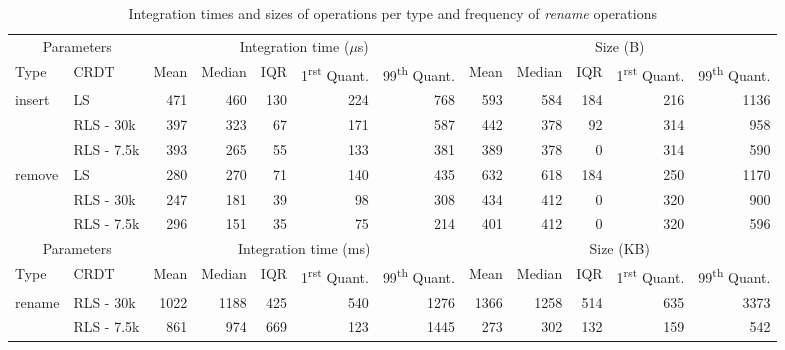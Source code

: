 \documentclass[10pt,journal,compsoc]{IEEEtran}
\let\MYoriglatexcaption\caption
\renewcommand{\caption}[2][\relax]{\MYoriglatexcaption[#2]{#2}}
\newcommand{\trm}[1]{\mathit{#1}}
\begin{document}
\begin{table}[!ht]
    \centering
    \label{tab:impact-frequency}
    \begin{tabular}{llrrrrrrrrrr}
        \toprule
        \multicolumn{2}{c}{Parameters} & \multicolumn{5}{c}{Integration time ($\trm{\mu}$s)}  & \multicolumn{5}{c}{Size (B)} \\
        \cmidrule(lr){1-2} \cmidrule(lr){3-7} \cmidrule(lr){8-12}
        Type & CRDT & Mean & Median &  IQR & 1\textsuperscript{rst} Quant. & 99\textsuperscript{th} Quant. & Mean & Median &  IQR & 1\textsuperscript{rst} Quant. & 99\textsuperscript{th} Quant. \\
        \midrule
        insert & LS &   471 &    460 &  130 &        224 &         768 &    593 &    584 &  184 &        216 &        1136 \\
               & RLS - 30k &   397 &    323 &   67 &        171 &         587 &    442 &    378 &   92 &        314 &         958 \\
               & RLS - 7.5k &   393 &    265 &   55 &        133 &         381 &    389 &    378 &    0 &        314 &         590 \\
        remove & LS &   280 &    270 &   71 &        140 &         435 &    632 &    618 &  184 &        250 &        1170 \\
               & RLS - 30k &   247 &    181 &   39 &         98 &         308 &    434 &    412 &    0 &        320 &         900 \\
               & RLS - 7.5k &   296 &    151 &   35 &         75 &         214 &    401 &    412 &    0 &        320 &         596 \\
        \midrule
        \multicolumn{2}{c}{Parameters} & \multicolumn{5}{c}{Integration time (ms)}  & \multicolumn{5}{c}{Size (KB)} \\
        \cmidrule(lr){1-2} \cmidrule(lr){3-7} \cmidrule(lr){8-12}
        Type & CRDT & Mean & Median &  IQR & 1\textsuperscript{rst} Quant. & 99\textsuperscript{th} Quant. & Mean & Median &  IQR & 1\textsuperscript{rst} Quant. & 99\textsuperscript{th} Quant. \\
        \midrule
        rename & RLS - 30k &  1022 &   1188 &  425 &        540 &        1276 &   1366 &   1258 &  514 &        635 &        3373 \\
               & RLS - 7.5k &   861 &    974 &  669 &        123 &        1445 &    273 &    302 &  132 &        159 &         542 \\
        \bottomrule
        \end{tabular}

    \caption{Integration times and sizes of operations per type and frequency of \emph{rename} operations}
\end{table}
\end{document}
